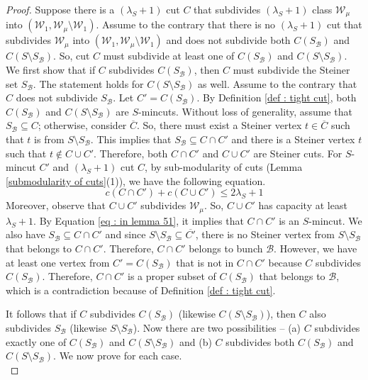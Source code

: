 \documentclass[letterpaper,11pt]{article}
\begin{document}
\begin{proof}
     Suppose there is a $(\lambda_S+1)$ cut $C$ that subdivides $(\lambda_S+1)$ class ${\mathcal W}_{\mu}$ into $({\mathcal W}_1,{\mathcal W}_{\mu}\setminus {\mathcal W}_1)$. Assume to the contrary that there is no $(\lambda_S+1)$ cut that subdivides ${\mathcal W}_{\mu}$ into $({\mathcal W}_1,{\mathcal W}_{\mu}\setminus {\mathcal W}_1)$ and does not subdivide both $C(S_{\mathcal B})$ and $C(S\setminus S_{\mathcal B})$. So, cut $C$ must subdivide at least one of $C(S_{\mathcal B})$ and $C(S\setminus S_{\mathcal B})$. We first show that if $C$ subdivides $C(S_{\mathcal B})$, then $C$ must subdivide the Steiner set $S_{\mathcal B}$. The statement holds for $C(S\setminus S_{\mathcal B})$ as well. Assume to the contrary that $C$ does not subdivide $S_{\mathcal B}$. Let $C'=C(S_{\mathcal B})$. By Definition \ref{def : tight cut}, both $C(S_{\mathcal B})$ and $C(S\setminus S_{\mathcal B})$ are $S$-mincuts. Without loss of generality, assume that $S_{\mathcal B}\subseteq C$; otherwise, consider $\overline{C}$. So, there must exist a Steiner vertex $t\in \overline{C}$ such that $t$ is from $S\setminus S_{\mathcal B}$. This implies that $S_{\mathcal B}\subseteq C\cap C'$ and there is a Steiner vertex $t$ such that $t\notin C\cup C'$. Therefore, both $C\cap C'$ and $C\cup C'$ are Steiner cuts. For $S$-mincut $C'$ and $(\lambda_S+1)$ cut $C$, by sub-modularity of cuts (Lemma \ref{submodularity of cuts}(1)), we have the following equation.
    \begin{equation} \label{eq : in lemma 51}
        c(C\cap C')+c(C\cup C')\le 2\lambda_S+1
    \end{equation}     
    Moreover, observe that $C\cup C'$ subdivides ${\mathcal W}_{\mu}$. So, $C\cup C'$ has capacity at least $\lambda_S+1$. By Equation \ref{eq : in lemma 51}, it implies that $C\cap C'$ is an $S$-mincut. We also have $S_{\mathcal B}\subseteq C\cap C'$ and since $S\setminus S_{\mathcal B}\subseteq \overline{C'}$, there is no Steiner vertex from $S\setminus S_{\mathcal B}$ that belongs to $C\cap C'$. Therefore, $C\cap C'$ belongs to bunch ${\mathcal B}$. However, we have at least one vertex from $C'=C(S_{\mathcal B})$ that is not in $C\cap C'$ because $C$ subdivides $C(S_{\mathcal B})$. Therefore, $C\cap C'$ is a proper subset of $C(S_{\mathcal B})$ that belongs to ${\mathcal B}$, which is a contradiction because of Definition \ref{def : tight cut}.

    It follows that if $C$ subdivides $C(S_{\mathcal B})$ (likewise $C(S\setminus S_{\mathcal B})$), then $C$ also subdivides $S_{\mathcal B}$ (likewise $S\setminus S_{\mathcal B}$). Now there are two possibilities -- (a) $C$ subdivides exactly one of $C(S_{\mathcal B})$ and $C(S\setminus S_{\mathcal B})$ and (b) $C$ subdivides both $C(S_{\mathcal B})$ and $C(S\setminus S_{\mathcal B})$. We now prove for each case.\\


\end{proof}
\end{document}
